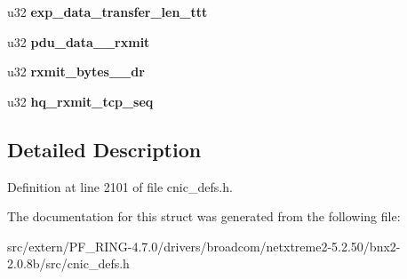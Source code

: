 \begin{DoxyCompactItemize}
\item 
\hypertarget{structxstorm__iscsi__context__section_ad48f5a18bef57932b37f95ab08443107}{
u32 {\bfseries exp\_\-data\_\-transfer\_\-len\_\-ttt}}
\label{structxstorm__iscsi__context__section_ad48f5a18bef57932b37f95ab08443107}

\item 
\hypertarget{structxstorm__iscsi__context__section_a40d5e0b561cff3354f2be583a6916ce6}{
u32 {\bfseries pdu\_\-data\_\_\-rxmit}}
\label{structxstorm__iscsi__context__section_a40d5e0b561cff3354f2be583a6916ce6}

\item 
\hypertarget{structxstorm__iscsi__context__section_a7232ec480864f5f5d13baf8c02b8ab3e}{
u32 {\bfseries rxmit\_\-bytes\_\_\-dr}}
\label{structxstorm__iscsi__context__section_a7232ec480864f5f5d13baf8c02b8ab3e}

\item 
\hypertarget{structxstorm__iscsi__context__section_a8c146282de1abaf4aa18ef1c6aae648a}{
u32 {\bfseries hq\_\-rxmit\_\-tcp\_\-seq}}
\label{structxstorm__iscsi__context__section_a8c146282de1abaf4aa18ef1c6aae648a}

\end{DoxyCompactItemize}


\subsection{Detailed Description}


Definition at line 2101 of file cnic\_\-defs.h.



The documentation for this struct was generated from the following file:\begin{DoxyCompactItemize}
\item 
src/extern/PF\_\-RING-\/4.7.0/drivers/broadcom/netxtreme2-\/5.2.50/bnx2-\/2.0.8b/src/cnic\_\-defs.h\end{DoxyCompactItemize}
